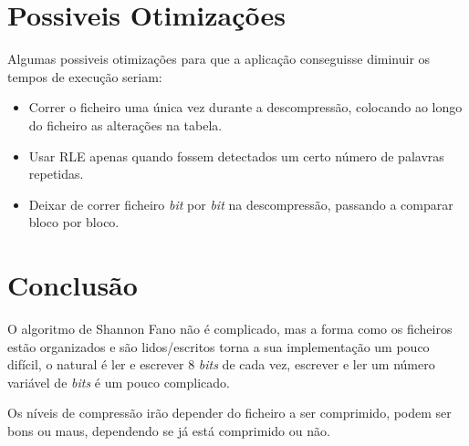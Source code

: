 \documentclass[11pt,a4paper]{report}
\begin{document}
\section{Possiveis Otimizações}
\label{sec:otimizacaoespecial}
Algumas possiveis otimizações para que a aplicação conseguisse diminuir os tempos de execução seriam: 
\begin{itemize}
\item Correr o ficheiro uma única vez durante a descompressão, colocando ao longo do ficheiro as alterações na tabela.
\item Usar RLE apenas quando fossem detectados um certo número de palavras repetidas.
\item Deixar de correr ficheiro \textit{bit} por \textit{bit} na descompressão, passando a comparar bloco por bloco.
\end{itemize}

\label{sec:otimizacaoespecial}

\section{Conclusão}
O algoritmo de Shannon Fano não é complicado, mas a forma como os ficheiros estão organizados e são lidos/escritos torna a sua implementação um pouco difícil, o natural é ler e escrever 8 \textit{bits} de cada vez, escrever e ler um número variável de \textit{bits} é um pouco complicado.

Os níveis de compressão irão depender do ficheiro a ser comprimido, podem ser bons ou maus, dependendo se já está comprimido ou não.
\end{document}
